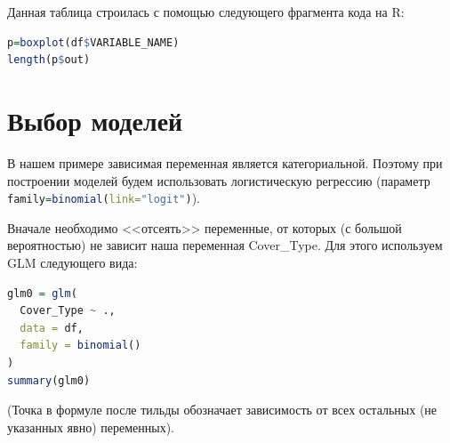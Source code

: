 \documentclass[12pt]{article}
\begin{document}
Данная таблица строилась с помощью следующего фрагмента кода на R:
\begin{lstlisting}[language=r]
p=boxplot(df$VARIABLE_NAME)
length(p$out)
\end{lstlisting}
\section{Выбор моделей}
В нашем примере зависимая переменная является категориальной. Поэтому при построении моделей будем использовать логистическую
регрессию (параметр \lstinline[language=r]|family=binomial(link="logit")|).

Вначале необходимо <<отсеять>> переменные, от которых (с большой вероятностью) не зависит наша переменная Cover\_Type. Для этого 
используем GLM следующего вида:
\begin{lstlisting}[language=r]
glm0 = glm(
  Cover_Type ~ .,
  data = df,
  family = binomial()
)
summary(glm0)
\end{lstlisting}
(Точка в формуле после тильды обозначает зависимость от всех остальных (не указанных явно) переменных).
\end{document}
